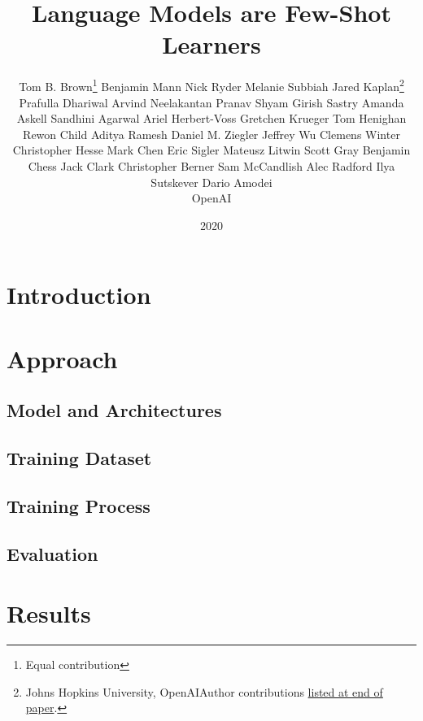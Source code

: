 \documentclass{article}
\title{Language Models are Few-Shot Learners}
\author{
Tom B. Brown\thanks{Equal contribution}
\And
Benjamin Mann\footnotemark[1]
\And
Nick Ryder\footnotemark[1]
\And
Melanie Subbiah\footnotemark[1]
\AND
Jared Kaplan\thanks{Johns Hopkins University, OpenAI\newline\newline Author contributions \hyperref[sec:contributions]{listed at end of paper}.}
\And
Prafulla Dhariwal
\And
Arvind Neelakantan
\And
Pranav Shyam
\And
Girish Sastry
\And
Amanda Askell
\And
Sandhini Agarwal
\And
Ariel Herbert-Voss
\And
Gretchen Krueger
\And
Tom Henighan
\And
Rewon Child
\And
Aditya Ramesh
\And
Daniel M. Ziegler
\And
Jeffrey Wu
\And
Clemens Winter
\AND
Christopher Hesse
\And
Mark Chen
\And
Eric Sigler
\And
Mateusz Litwin
\And
Scott Gray
\AND
Benjamin Chess
\And
Jack Clark
\And
Christopher Berner
\AND
Sam McCandlish
\And
Alec Radford
\And
Ilya Sutskever
\And
Dario Amodei 
\AND
\\
{\large OpenAI}
}
\date{2020}
\begin{document}
\maketitle
\begin{abstract}
   
\end{abstract}


\newpage
\setcounter{tocdepth}{2}
\tableofcontents
\newpage

\setcounter{footnote}{0}
\makeatletter
\let\@fnsymbol\@arabic
\makeatother

% 
% 
\section{Introduction}
\label{section:Introduction}


% 
% 
\section{Approach}
\label{section:Approach}


    \subsection{Model and Architectures}
    \label{section:Model and Architectures}
    

    \subsection{Training Dataset}
    \label{section:Training Dataset}
    

    \subsection{Training Process}
    \label{section:Training Process}
    
    
    \subsection{Evaluation}
    \label{section:Evaluation}
    

%
%
\section{Results}
\label{section:Results}

\end{document}
